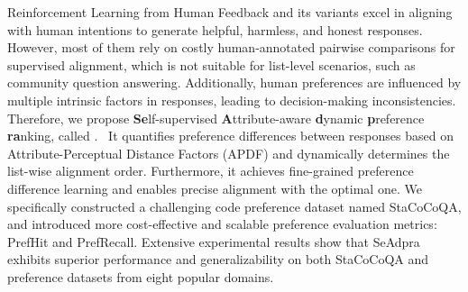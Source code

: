 Reinforcement Learning from Human Feedback and its variants excel in aligning with human intentions to generate helpful, harmless, and honest responses. 
However, most of them rely on costly human-annotated pairwise comparisons for supervised alignment, which is not suitable for list-level scenarios, such as community question answering.
Additionally, human preferences are influenced by multiple intrinsic factors in responses, leading to decision-making inconsistencies.
Therefore, we propose \textbf{Se}lf-supervised \textbf{A}ttribute-aware \textbf{d}ynamic \textbf{p}reference \textbf{ra}nking, called \shortname. \
It quantifies preference differences between responses based on Attribute-Perceptual Distance Factors (APDF) and dynamically determines the list-wise alignment order.
Furthermore, it achieves fine-grained preference difference learning and enables precise alignment with the optimal one.
We specifically constructed a challenging code preference dataset named StaCoCoQA, and introduced more cost-effective and scalable preference evaluation metrics: PrefHit and PrefRecall.
Extensive experimental results show that SeAdpra exhibits superior performance and generalizability on both StaCoCoQA and preference datasets from eight popular domains.

